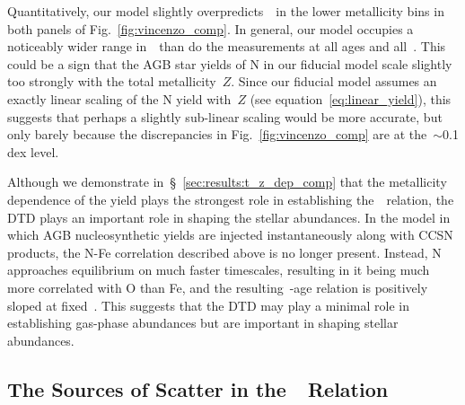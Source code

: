 \documentclass[ms.tex]{subfiles}
\begin{document}
\par
Quantitatively, our model slightly overpredicts~\no~in the lower metallicity
bins in both panels of Fig.~\ref{fig:vincenzo_comp}.
In general, our model occupies a noticeably wider range in~\no~than do the
\citet{Vincenzo2021} measurements at all ages and all~\ofe.
This could be a sign that the AGB star yields of N in our fiducial model scale
slightly too strongly with the total metallicity~$Z$.
Since our fiducial model assumes an exactly linear scaling of the N yield
with~$Z$ (see equation~\ref{eq:linear_yield}), this suggests that perhaps a
slightly sub-linear scaling would be more accurate, but only barely because
the discrepancies in Fig.~\ref{fig:vincenzo_comp} are at the~$\sim$0.1 dex
level.
\par
Although we demonstrate in~\S~\ref{sec:results:t_z_dep_comp} that the
metallicity dependence of the yield plays the strongest role in establishing
the~\ohno~relation, the DTD plays an important role in shaping the stellar
abundances.
In the model in which AGB nucleosynthetic yields are injected instantaneously
along with CCSN products, the N-Fe correlation described above is no longer
present.
Instead, N approaches equilibrium on much faster timescales, resulting in it
being much more correlated with O than Fe, and the resulting~\no-age relation
is positively sloped at fixed~\feh.
This suggests that the DTD may play a minimal role in establishing gas-phase
abundances but are important in shaping stellar abundances.

\subsection{The Sources of Scatter in the~\ohno~Relation}
\label{sec:results:schaefer_comp}
\end{document}
